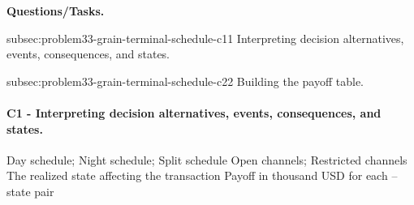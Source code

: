 	\textbf{Questions/Tasks.}
	\begin{enumerate}
	\CriterionTask
	{subsec:problem33-grain-terminal-schedule-c1}{1}
	{Interpreting decision alternatives, events, consequences, and states.}

	\CriterionTask
	{subsec:problem33-grain-terminal-schedule-c2}{2}
	{Building the payoff table.}
	\end{enumerate}

	\paragraph*{C1 - Interpreting decision alternatives, events, consequences, and states.}
	\label{subsec:problem33-grain-terminal-schedule-c1}
	\DecisionElementsTable
	{Day schedule; Night schedule; Split schedule}
	{Open channels; Restricted channels}
	{The realized state affecting the transaction}
	{Payoff in thousand USD for each --state pair}

